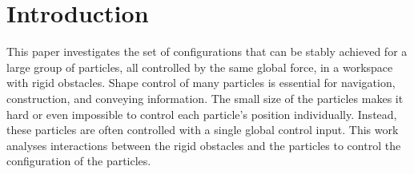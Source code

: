 \section{Introduction}\label{sec:Intro}



This paper investigates the set of configurations that can be stably achieved for a  large group of particles, all controlled by the same global force, in a workspace with rigid obstacles.
Shape control of many particles is essential for navigation, construction, and conveying information. 
 The small size of the particles makes it hard or even impossible to control each particle's position individually. Instead, these particles are often controlled with a single global control input.
   This work analyses interactions between the rigid obstacles and the particles to control the configuration of the particles.



